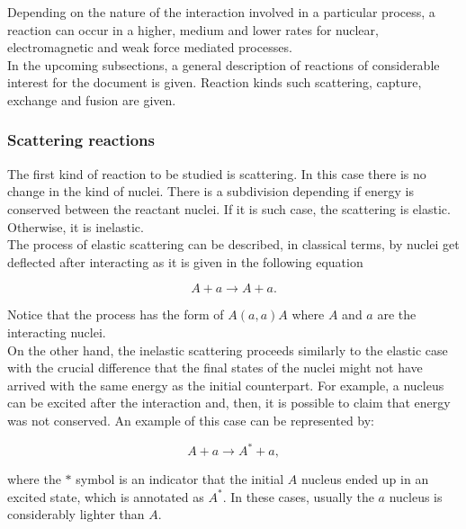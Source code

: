 \documentclass[openany]{book}
\begin{document}
Depending on the nature of the interaction involved in a particular process, a reaction can occur in a higher, medium and lower rates for nuclear, electromagnetic and weak force mediated processes. \\

In the upcoming subsections, a general description of reactions of considerable interest for the document is given. Reaction kinds such scattering, capture, exchange and fusion are given. 

\subsubsection{Scattering reactions} \label{ssub:scatteringReactions}

The first kind of reaction to be studied is scattering. In this case there is no change in the kind of nuclei. There is a subdivision depending if energy is conserved between the reactant nuclei. If it is such case, the scattering is elastic. Otherwise, it is inelastic. \\

The process of elastic scattering can be described, in classical terms, by nuclei get deflected after interacting as it is given in the following equation

\begin{equation}  \label{eq:nuclearReaction_scattering_elastic}
	A + a \rightarrow A + a.
\end{equation}

Notice that the process has the form of $A(a, a)A$ where $A$ and $a$ are the interacting nuclei. \\

On the other hand, the inelastic scattering proceeds similarly to the elastic case with the crucial difference that the final states of the nuclei might not have arrived with the same energy as the initial counterpart. For example, a nucleus can be excited after the interaction and, then, it is possible to claim that energy was not conserved. An example of this case can be represented by:

\begin{equation}  \label{eq:nuclearReaction_scattering_inelastic}
	A + a \rightarrow A^{*} + a,
\end{equation}

where the $*$ symbol is an indicator that the initial $A$ nucleus ended up in an excited state, which is annotated as $A^{*}$. In these cases, usually the $a$ nucleus is considerably lighter than $A$.\\ 
\end{document}
